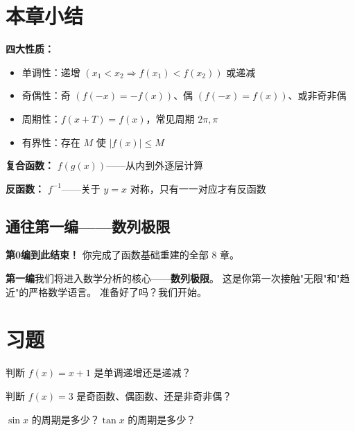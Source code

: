 \section{本章小结}

\begin{progressbox}
\textbf{四大性质：}
\begin{itemize}
  \item 单调性：递增 \((x_1 < x_2 \Rightarrow f(x_1) < f(x_2))\) 或递减
  \item 奇偶性：奇 \((f(-x) = -f(x))\)、偶 \((f(-x) = f(x))\)、或非奇非偶
  \item 周期性：\(f(x + T) = f(x)\)，常见周期 \(2\pi, \pi\)
  \item 有界性：存在 \(M\) 使 \(|f(x)| \le M\)
\end{itemize}

\textbf{复合函数：} \(f(g(x))\)——从内到外逐层计算

\textbf{反函数：} \(f^{-1}\)——关于 \(y = x\) 对称，只有一一对应才有反函数
\end{progressbox}

\subsection*{通往第一编——数列极限}

\textbf{第0编到此结束！} 你完成了函数基础重建的全部 8 章。

\textbf{第一编}我们将进入数学分析的核心——\textbf{数列极限}。
这是你第一次接触"无限"和"趋近"的严格数学语言。
准备好了吗？我们开始。


\section{习题}


\begin{exercise}[0]
判断 \(f(x) = x + 1\) 是单调递增还是递减？
\end{exercise}

\begin{exercise}[0]
判断 \(f(x) = 3\) 是奇函数、偶函数、还是非奇非偶？
\end{exercise}

\begin{exercise}[0]
\(\sin x\) 的周期是多少？\(\tan x\) 的周期是多少？
\end{exercise}

